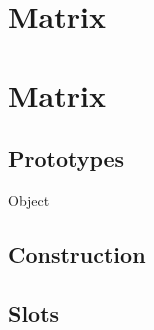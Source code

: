 
\section{Matrix}

\section{Matrix}

\subsection{Prototypes}
\begin{refObjects}
\item[Object]
\end{refObjects}

\subsection{Construction}

\subsection{Slots}

